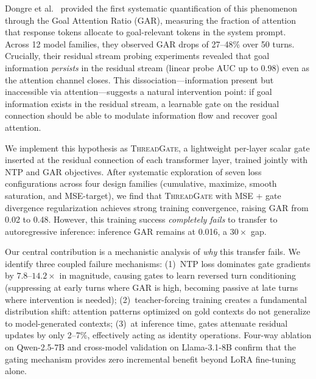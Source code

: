 \documentclass[11pt,a4paper]{article}
\newcommand{\gar}{\textsc{GAR}}
\newcommand{\tg}{\textsc{ThreadGate}}
\begin{document}
Dongre et al.~\cite{dongre2026} provided the first systematic quantification of this phenomenon through the Goal Attention Ratio (\gar{}), measuring the fraction of attention that response tokens allocate to goal-relevant tokens in the system prompt.
Across 12 model families, they observed \gar{} drops of 27--48\% over 50 turns.
Crucially, their residual stream probing experiments revealed that goal information \emph{persists} in the residual stream (linear probe AUC up to 0.98) even as the attention channel closes.
This dissociation---information present but inaccessible via attention---suggests a natural intervention point: if goal information exists in the residual stream, a learnable gate on the residual connection should be able to modulate information flow and recover goal attention.

We implement this hypothesis as \tg{}, a lightweight per-layer scalar gate inserted at the residual connection of each transformer layer, trained jointly with NTP and \gar{} objectives.
After systematic exploration of seven loss configurations across four design families (cumulative, maximize, smooth saturation, and MSE-target), we find that \tg{} with MSE + gate divergence regularization achieves strong training convergence, raising \gar{} from 0.02 to 0.48.
However, this training success \emph{completely fails} to transfer to autoregressive inference: inference \gar{} remains at 0.016, a $30\times$ gap.

Our central contribution is a mechanistic analysis of \emph{why} this transfer fails.
We identify three coupled failure mechanisms: (1)~NTP loss dominates gate gradients by $7.8$--$14.2\times$ in magnitude, causing gates to learn reversed turn conditioning (suppressing at early turns where \gar{} is high, becoming passive at late turns where intervention is needed); (2)~teacher-forcing training creates a fundamental distribution shift: attention patterns optimized on gold contexts do not generalize to model-generated contexts; (3)~at inference time, gates attenuate residual updates by only 2--7\%, effectively acting as identity operations.
Four-way ablation on Qwen-2.5-7B and cross-model validation on Llama-3.1-8B confirm that the gating mechanism provides zero incremental benefit beyond LoRA fine-tuning alone.
\end{document}
